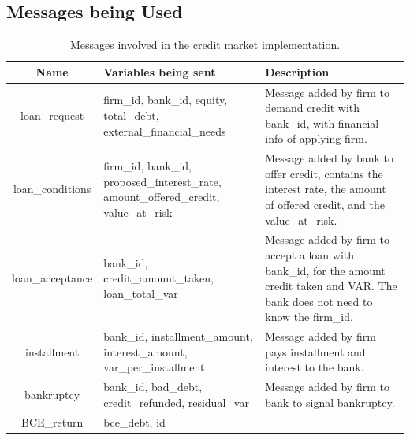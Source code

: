 \subsection{Messages being Used}



\begin{table}[!htb]\caption{Messages involved in the credit market implementation.}
\begin{center}
\begin{tabular}{|c|l|l|}
\hline
Name & Variables being sent & Description \\
\hline loan\_request & {\parbox[l]{5cm}{firm\_id, bank\_id, equity,
total\_debt, external\_financial\_needs}}& {\parbox[l]{5cm}{Message
added by firm to demand credit with bank\_id,
with financial info of applying firm.}} \\
\hline loan\_conditions & {\parbox[l]{5cm}{firm\_id, bank\_id,
proposed\_interest\_rate, amount\_offered\_credit, value\_at\_risk}}
& {\parbox[l]{5cm}{Message added by bank to offer credit, contains
the interest rate, the amount of
offered credit, and the value\_at\_risk.}}  \\

\hline loan\_acceptance & {\parbox[l]{5cm}{bank\_id,
credit\_amount\_taken, loan\_total\_var}} & {\parbox[l]{5cm}{Message
added by firm to accept a loan with bank\_id, for the amount credit
taken and VAR. The bank
does not need to know the firm\_id.}}   \\
\hline

installment & {\parbox[l]{5cm}{bank\_id, installment\_amount,
interest\_amount, var\_per\_installment}} & {\parbox[l]{5cm}{Message
added by firm pays
installment and interest to the bank.}}    \\

\hline bankruptcy & {\parbox[l]{5cm}{bank\_id, bad\_debt,
credit\_refunded, residual\_var}} &{\parbox[l]{5cm}{Message added by
firm to bank
to signal bankruptcy.}}  \\
\hline BCE\_return &
{\parbox[l]{5cm}{bce\_debt, id}} & {\parbox[l]{5cm}{}}  \\
\hline

\end{tabular}\end{center}\label{tab:creditmarketmsg}
\end{table}

